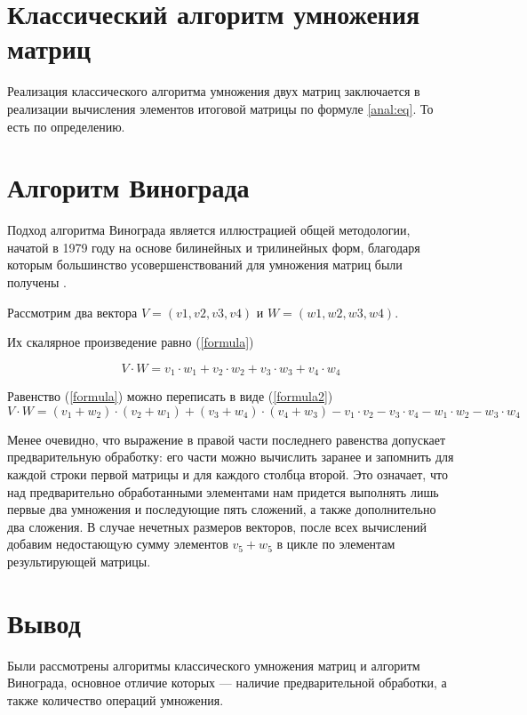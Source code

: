 \section{Классический алгоритм умножения матриц}

Реализация классического алгоритма умножения двух матриц заключается в реализации вычисления элементов итоговой матрицы по формуле \ref{anal:eq}. То есть по определению.

\section{Алгоритм Винограда}
Подход алгоритма Винограда является иллюстрацией общей методологии, начатой в 1979 году на основе билинейных и трилинейных форм, благодаря которым большинство усовершенствований для умножения матриц были получены \cite{Gall2012}.

Рассмотрим два вектора $V = (v1, v2, v3, v4)$ и $W = (w1, w2, w3, w4)$.  

Их скалярное произведение равно (\ref{formula}) 

\begin{equation} \label{formula}
	V \cdot W=v_1 \cdot w_1 + v_2 \cdot w_2 + v_3 \cdot w_3 + v_4 \cdot w_4
\end{equation}

Равенство (\ref{formula}) можно переписать в виде (\ref{formula2}) 
\begin{equation} \label{formula2}
	V \cdot W=(v_1 + w_2) \cdot (v_2 + w_1) + (v_3 + w_4) \cdot (v_4 + w_3) - v_1 \cdot v_2 - v_3 \cdot v_4 - w_1 \cdot w_2 - w_3 \cdot w_4
\end{equation}

Менее очевидно, что выражение в правой части последнего равенства допускает предварительную обработку: его части можно вычислить заранее и запомнить для каждой строки первой матрицы и для каждого столбца второй. 
Это означает, что над предварительно обработанными элементами нам придется выполнять лишь первые два умножения и последующие пять сложений, а также дополнительно два сложения. 
В случае нечетных размеров векторов, после всех вычислений добавим недостающyю сумму элементов $v_5 + w_5$ в цикле по элементам результирующей матрицы. 


\section*{Вывод}
Были рассмотрены алгоритмы классического умножения матриц и алгоритм Винограда, основное отличие которых — наличие предварительной обработки, а также количество операций умножения.